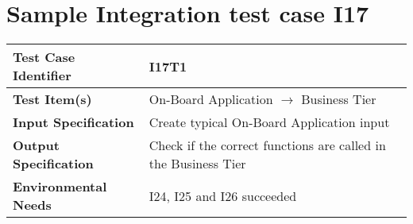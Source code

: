 \section{Sample Integration test case I17}\label{I17}
\begin{center}
	\vspace{0.6cm}
	\begin{tabular}{|l|l|}
		\hline
		\textbf{Test Case Identifier} & I17T1 \bigstrut \\\hline
		\textbf{Test Item(s)} & On-Board Application \ensuremath{\rightarrow} Business Tier \bigstrut \\\hline
		\textbf{Input Specification} & Create typical On-Board Application input \bigstrut \\\hline
		\textbf{Output Specification} & Check if the correct functions are called in the Business Tier \bigstrut \\\hline
		\textbf{Environmental Needs} & I24, I25 and I26 succeeded \bigstrut \\\hline
	\end{tabular}
\end{center}

